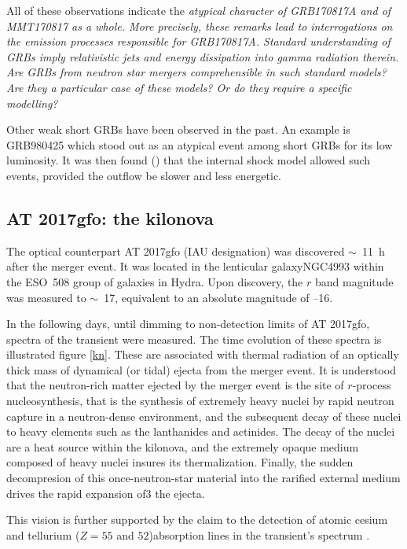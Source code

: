 All of these observations indicate the \it{atypical} character of GRB170817A and of MMT170817 as a whole. More precisely, these remarks lead to interrogations on the emission processes responsible for GRB170817A. Standard understanding of GRBs imply relativistic jets and energy dissipation into gamma radiation therein. Are GRBs from neutron star mergers comprehensible in such standard models? Are they a particular case of these models? Or do they require a specific modelling?

Other weak short GRBs have been observed in the past. An example is GRB980425 which stood out as an atypical event among short GRBs for its low luminosity. It was then found (\cite{50}) that the internal shock model allowed such events, provided the outflow be slower and less energetic.


\subsection{AT 2017gfo: the kilonova}
The optical counterpart AT 2017gfo (IAU designation) was discovered $\sim$~11~h after the merger event. It was located in the lenticular galaxyNGC4993 within the ESO~508 group of galaxies in Hydra. Upon discovery, the $r$ band magnitude was measured to $\sim$~17, equivalent to an absolute magnitude of --16.

In the following days, until dimming to non-detection limits of AT 2017gfo, spectra of the transient were measured. The time evolution of these spectra is illustrated figure \ref{kn}. These are associated with thermal radiation of an optically thick mass of dynamical (or tidal) ejecta from the merger event. It is understood that the neutron-rich matter ejected by the merger event is the site of $r$-process nucleosynthesis, that is the synthesis of extremely heavy nuclei by rapid neutron capture in a neutron-dense environment, and the subsequent decay of these nuclei to heavy elements such as the lanthanides and actinides. The decay of the nuclei are a heat source within the kilonova, and the extremely opaque medium composed of heavy nuclei insures its thermalization. Finally, the sudden decompresion of this once-neutron-star material into the rarified external medium drives the rapid expansion of3 the ejecta.

This vision is further supported by the claim to the detection of atomic cesium and tellurium ($Z = 55$ and $52$)absorption lines in the transient's spectrum \cite{53}.



